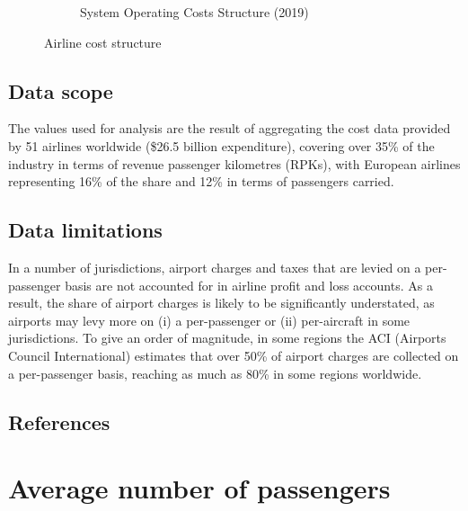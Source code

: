 \documentclass[
  11pt,
  a4paper,
]{book}
\begin{document}
\begin{figure}
\begin{minipage}[t]{0.50\linewidth}
{\begin{figure}
{}

\caption{System Operating Costs Structure (2019)}

\end{figure}

}

\end{minipage}%

\caption{\label{fig-operating-costs-split}Airline cost structure}

\end{figure}

\hypertarget{data-scope}{%
\section{Data scope}\label{data-scope}}

The values used for analysis are the result of aggregating the cost data
provided by 51 airlines worldwide (\$26.5 billion expenditure), covering
over 35\% of the industry in terms of revenue passenger kilometres
(RPKs), with European airlines representing 16\% of the share and 12\%
in terms of passengers carried.

\hypertarget{data-limitations}{%
\section{Data limitations}\label{data-limitations}}

In a number of jurisdictions, airport charges and taxes that are levied
on a per-passenger basis are not accounted for in airline profit and
loss accounts. As a result, the share of airport charges is likely to be
significantly understated, as airports may levy more on (i) a
per-passenger or (ii) per-aircraft in some jurisdictions. To give an
order of magnitude, in some regions the ACI (Airports Council
International) estimates that over 50\% of airport charges are collected
on a per-passenger basis, reaching as much as 80\% in some regions
worldwide.

\hypertarget{references-12}{%
\section{References}\label{references-12}}

\hypertarget{sec-average-number-of-passengers}{%
\chapter{Average number of
passengers}\label{sec-average-number-of-passengers}}
\end{document}
